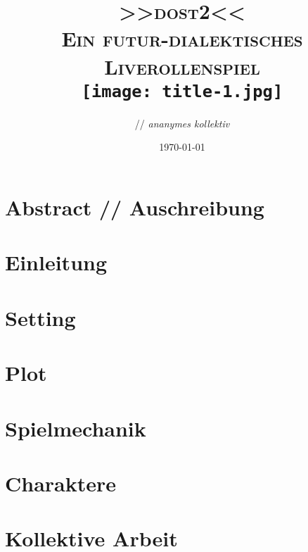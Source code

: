 \documentclass[12pt, a4paper, openany]{book}
\title{
  \vspace{-2cm}
  { \Large 
    \textbf{\textsc{>>\acs{dost2}<<}}\\
  }
  \vspace{0.4cm}
  { \large \color{gray}
    \textsc{Ein futur-dialektisches Liverollenspiel}
  }\\
  \vspace{2cm}
  {\texttt{[image: title-1.jpg]}}\\
  \vspace{1cm}
}
\author{\creators{} // \emph{ananymes kollektiv}}
\date{{\small \today}}
\begin{document}
\frontmatter

\begingroup
  \hypersetup{hidelinks}
  \maketitle

\chapter*{Abstract // Auschreibung}


\endgroup
\begingroup
  \hypersetup{hidelinks}
  \tableofcontents
\endgroup



\mainmatter
\chapter{Einleitung}


\chapter{Setting}


\chapter{Plot}


\chapter{Spielmechanik}


\chapter{Charaktere}


\chapter{Kollektive Arbeit}

\end{document}
